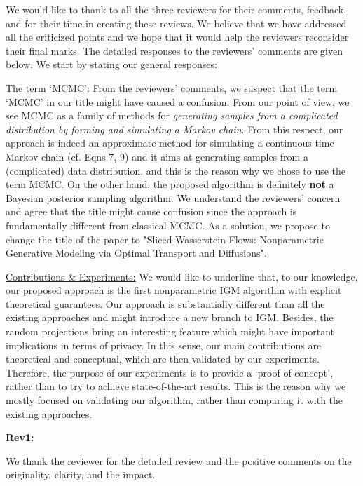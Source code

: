 \documentclass{article}
\newcommand{\umut}[1]{{\color{blue} #1}}
\begin{document}
We would like to thank to all the three reviewers for their comments, feedback, and for their time in creating these reviews. We believe that we have addressed all the criticized points and we hope that it would help the reviewers reconsider their final marks.
The detailed responses to the reviewers' comments are given below. 
We start by stating our general responses:


\underline{The term `MCMC':} From the reviewers' comments, we suspect that the term `MCMC' in our title might have caused a confusion. From our point of view, we see MCMC as a family of methods for \emph{generating samples from a complicated distribution by forming and simulating a Markov chain}. From this respect, our approach is indeed an approximate method for simulating a continuous-time Markov chain (cf. Eqns 7, 9) and it aims at generating samples from a (complicated) data distribution, and this is the reason why we chose to use the term MCMC. On the other hand, the proposed algorithm is definitely \textbf{not} a Bayesian posterior sampling algorithm. We understand the reviewers' concern and agree that the title might cause confusion since the approach is fundamentally different from classical MCMC. As a solution, we propose to change the title of the paper to "Sliced-Wasserstein Flows: Nonparametric Generative Modeling via Optimal Transport and Diffusions".

\underline{Contributions \& Experiments:} We would like to underline that, to our knowledge, our proposed approach is the first nonparametric IGM algorithm with explicit theoretical guarantees. Our approach is substantially different than all the existing approaches and might introduce a new branch to IGM. Besides, the random projections bring an interesting feature which might have important implications in terms of privacy. In this sense, our main contributions are theoretical and conceptual, which are then validated by our experiments. Therefore, the purpose of our experiments is to provide a `proof-of-concept', rather than to try to achieve state-of-the-art results. This is the reason why we mostly focused on validating our algorithm, rather than comparing it with the existing approaches. 


\textbf{Rev1: }

We thank the reviewer for the detailed review and the positive comments on the originality, clarity, and the impact. %
\end{document}
